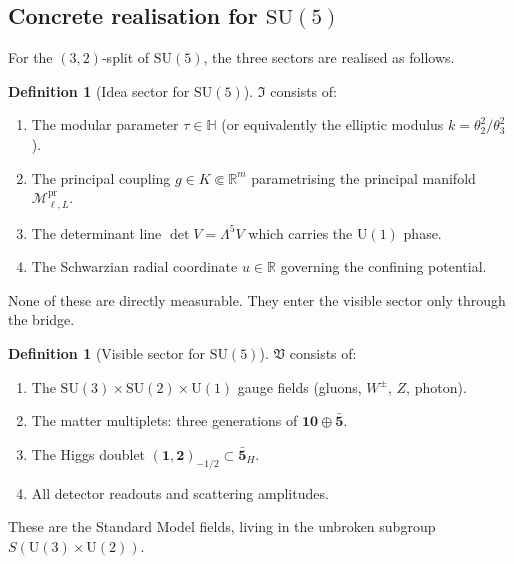 \documentclass[12pt]{article}
\theoremstyle{plain}
\theoremstyle{definition}
\newtheorem{definition}[theorem]{Definition}
\numberwithin{equation}{section}
\newcommand{\R}{\mathbb{R}}
\newcommand{\HH}{\mathbb{H}}
\newcommand{\fI}{\mathfrak{I}}
\newcommand{\fV}{\mathfrak{V}}
\newcommand{\pr}{\mathrm{pr}}
\begin{document}
\subsection{Concrete realisation for $\mathrm{SU}(5)$}

For the $(3,2)$-split of $\mathrm{SU}(5)$, the three sectors are realised as follows.

\begin{definition}[Idea sector for $\mathrm{SU}(5)$]
$\fI$ consists of:
\begin{enumerate}[label=(\roman*)]
\item The modular parameter $\tau\in\HH$ (or equivalently the elliptic modulus $k=\theta_2^2/\theta_3^2$).
\item The principal coupling $g\in K\Subset\R^m$ parametrising the principal manifold $\mathcal{M}^{\pr}_{\ell,L}$.
\item The determinant line $\det V=\Lambda^5 V$ which carries the $\mathrm{U}(1)$ phase.
\item The Schwarzian radial coordinate $u\in\R$ governing the confining potential.
\end{enumerate}
None of these are directly measurable.  They enter the visible sector only through the bridge.
\end{definition}

\begin{definition}[Visible sector for $\mathrm{SU}(5)$]
$\fV$ consists of:
\begin{enumerate}[label=(\roman*)]
\item The $\mathrm{SU}(3)\times\mathrm{SU}(2)\times\mathrm{U}(1)$ gauge fields (gluons, $W^\pm$, $Z$, photon).
\item The matter multiplets: three generations of $\mathbf{10}\oplus\bar{\mathbf{5}}$.
\item The Higgs doublet $(\mathbf{1},\mathbf{2})_{-1/2}\subset\bar{\mathbf{5}}_H$.
\item All detector readouts and scattering amplitudes.
\end{enumerate}
These are the Standard Model fields, living in the unbroken subgroup $S(\mathrm{U}(3)\times\mathrm{U}(2))$.
\end{definition}
\end{document}

